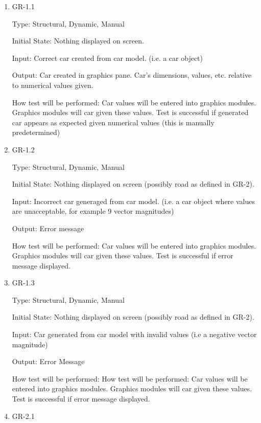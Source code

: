 \documentclass[12pt, titlepage]{article}
\begin{document}
\begin{enumerate}

\item{GR-1.1\\}

Type: Structural, Dynamic, Manual
					
Initial State: Nothing displayed on screen.
					
Input: Correct car created from car model. (i.e. a car object)
					
Output: Car created in graphics pane. Car's dimensions, values, etc. relative to numerical values given.
					
How test will be performed: Car values will be entered into graphics modules. Graphics modules will car given these values. Test is  successful if generated car appears as expected given numerical values (this is manually predetermined)

\item{GR-1.2\\}

Type: Structural, Dynamic, Manual
					
Initial State: Nothing displayed on screen (possibly road as defined in GR-2).
					
Input: Incorrect car generaged from car model. (i.e. a car object where values are unacceptable, for example 9 vector magnitudes)
					
Output: Error message
					
How test will be performed: Car values will be entered into graphics modules. Graphics modules will car given these values. Test is successful if error message displayed.

\item{GR-1.3\\}

Type: Structural, Dynamic, Manual
					
Initial State: Nothing displayed on screen (possibly road as defined in GR-2).
					
Input: Car generated from car model with invalid values (i.e a negative vector magnitude)
					
Output: Error Message
					
How test will be performed: How test will be performed: Car values will be entered into graphics modules. Graphics modules will car given these values. Test is successful if error message displayed.
					
\item{GR-2.1\\}


\end{enumerate}
\end{document}
